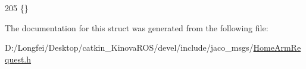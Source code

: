 \begin{DoxyCode}
205   \{\}
\end{DoxyCode}


The documentation for this struct was generated from the following file\+:\begin{DoxyCompactItemize}
\item 
D\+:/\+Longfei/\+Desktop/catkin\+\_\+\+Kinova\+R\+O\+S/devel/include/jaco\+\_\+msgs/\hyperlink{HomeArmRequest_8h}{Home\+Arm\+Request.\+h}\end{DoxyCompactItemize}
